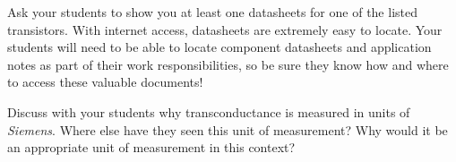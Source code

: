 
Ask your students to show you at least one datasheets for one of the listed transistors.  With internet access, datasheets are extremely easy to locate.  Your students will need to be able to locate component datasheets and application notes as part of their work responsibilities, so be sure they know how and where to access these valuable documents!

Discuss with your students why transconductance is measured in units of {\it Siemens}.  Where else have they seen this unit of measurement?  Why would it be an appropriate unit of measurement in this context?




